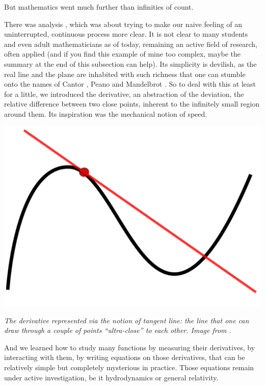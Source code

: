 \documentclass{article}
\begin{document}
But mathematics went much further than infinities of count.

There was analysis \cite{ANALYSIS}, which was about trying to make our naive feeling of an uninterrupted, continuous process more clear. It is not clear to many students and even adult mathematicians as of today, remaining an active field of research, often applied (and if you find this example of mine too complex, maybe the summary at the end of this subsection can help). Its simplicity is devilish, as the real line and the plane are inhabited with such richness that one can stumble onto the names of Cantor \cite{CANTOR}, Peano \cite{PEANO} and Mandelbrot
\cite{MANDELBROT}. So to deal with this at least for a little, we introduced the derivative, an abstraction of the deviation, the relative difference between two close points, inherent to the infinitely small region around them. Its inspiration was the mechanical notion of speed.

\begin{center}
\includegraphics[scale=0.045]{Tangent_to_a_curve.jpg}

\textit{The derivative represented via the notion of tangent line: the line that one can draw through a couple of points ``ultra-close'' to each other. Image from \cite{DERIVATIVE}.}
\end{center}

 And we learned how to study many functions by measuring their derivatives, by interacting with them, by writing equations on those derivatives, that can be relatively simple but completely mysterious in practice. Those equations remain under active investigation, be it hydrodynamics or general relativity.
\end{document}
